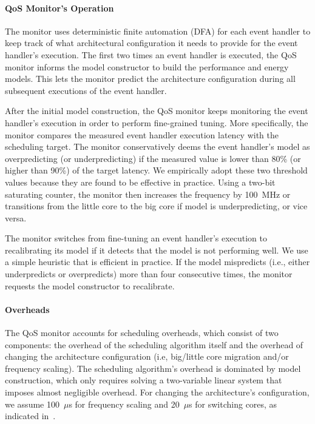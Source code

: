 \paragraph{QoS Monitor's Operation} The monitor uses deterministic finite automation (DFA) for each event handler to keep track of what architectural configuration it needs to provide for the event handler's execution. The first two times an event handler is executed, the QoS monitor informs the model constructor to build the performance and energy models. This lets the monitor predict the architecture configuration during all subsequent executions of the event handler.

After the initial model construction, the QoS monitor keeps monitoring the event handler's execution in order to perform fine-grained tuning. More specifically, the monitor compares the measured event handler execution latency with the scheduling target. The monitor conservatively deems the event handler's model as overpredicting (or underpredicting) if the measured value is lower than 80\% (or higher than 90\%) of the target latency. We empirically adopt these two threshold values because they are found to be effective in practice. Using a two-bit saturating counter, the monitor then increases the frequency by 100~MHz or transitions from the little core to the big core if model is underpredicting, or vice versa.

The monitor switches from fine-tuning an event handler's execution to recalibrating its model if it detects that the model is not performing well. We use a simple heuristic that is efficient in practice. If the model mispredicts (i.e., either underpredicts or overpredicts) more than four consecutive times, the monitor requests the model constructor to recalibrate.

\paragraph{Overheads} The QoS monitor accounts for scheduling overheads, which consist of two components: the overhead of the scheduling algorithm itself and the overhead of changing the architecture configuration (i.e, big/little core migration and/or frequency scaling). The scheduling algorithm's overhead is dominated by model construction, which only requires solving a two-variable linear system that imposes almost negligible overhead. For changing the architecture's configuration, we assume 100~$\mu$s for frequency scaling and 20~$\mu$s for switching cores, as indicated in~\cite{arm-bl-sw-wp,arm-bl-wp}.

